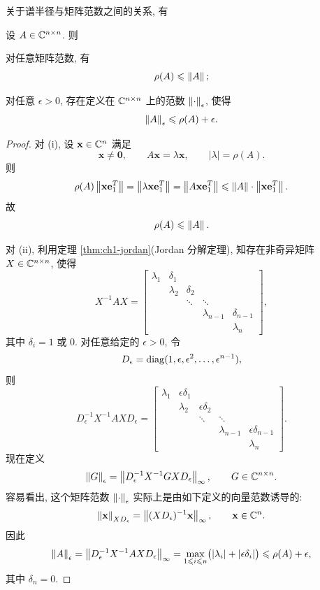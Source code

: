 关于谱半径与矩阵范数之间的关系, 有

\begin{theorem}
\label{thm:3-4}
设 $A\in\mathbb{C}^{n\times n}$. 则
\begin{romanlist}
  \item 对任意矩阵范数, 有
  \[
    \rho(A)\leqslant\left\|A\right\|;
  \]
  \item 对任意 $\epsilon>0$, 存在定义在 $\mathbb{C}^{n\times n}$ 上的范数 $\left\|\cdot\right\|_\epsilon$, 使得
  \[
    \left\|A\right\|_\epsilon\leqslant\rho(A)+\epsilon.
  \]
\end{romanlist}
\end{theorem}

\begin{proof}
对 (i), 设 $\mathbf{x}\in\mathbb{C}^n$ 满足
\[
  \mathbf{x}\neq\mathbf{0},\qquad A\mathbf{x}=\lambda\mathbf{x},\qquad|\lambda|=\rho(A).
\]
则
\[
  \rho(A)\left\|\mathbf{x}\mathbf{e}_1^T\right\|=\left\|\lambda\mathbf{x}\mathbf{e}_1^T\right\|
  =\left\|A\mathbf{x}\mathbf{e}_1^T\right\|\leqslant\left\|A\right\|\cdot\left\|\mathbf{x}\mathbf{e}_1^T\right\|.
\]
故
\[
  \rho(A)\leqslant\left\|A\right\|.
\]

对 (ii), 利用定理 \ref{thm:ch1-jordan}(Jordan 分解定理), 知存在非奇异矩阵 $X\in\mathbb{C}^{n\times n}$, 使得
\[
  X^{-1}AX=
  \begin{bmatrix}
    \lambda_1 & \delta_1 &           &        &                \\
              & \lambda_2 & \delta_2 &        &                \\
              &           & \ddots    & \ddots &                \\
              &           &           & \lambda_{n-1} & \delta_{n-1}\\
              &           &           &        & \lambda_n
  \end{bmatrix},
\]
其中 $\delta_i=1$ 或 $0$. 对任意给定的 $\epsilon>0$, 令
\[
  D_\epsilon=\operatorname{diag}(1,\epsilon,\epsilon^2,\ldots,\epsilon^{n-1}),
\]
则
\[
  D_\epsilon^{-1}X^{-1}AXD_\epsilon=
  \begin{bmatrix}
    \lambda_1 & \epsilon\delta_1 &           &        &                \\
              & \lambda_2 & \epsilon\delta_2 &        &                \\
              &           & \ddots    & \ddots &                \\
              &           &           & \lambda_{n-1} & \epsilon\delta_{n-1}\\
              &           &           &        & \lambda_n
  \end{bmatrix}.
\]
现在定义
\[
  \left\|G\right\|_\epsilon=\left\|D_\epsilon^{-1}X^{-1}GXD_\epsilon\right\|_\infty,
  \qquad G\in\mathbb{C}^{n\times n}.
\]
容易看出, 这个矩阵范数 $\left\|\cdot\right\|_\epsilon$ 实际上是由如下定义的向量范数诱导的:
\[
  \left\|\mathbf{x}\right\|_{XD_\epsilon}=\left\|(XD_\epsilon)^{-1}\mathbf{x}\right\|_\infty,
  \qquad\mathbf{x}\in\mathbb{C}^n.
\]
因此
\[
  \left\|A\right\|_\epsilon=\left\|D_\epsilon^{-1}X^{-1}AXD_\epsilon\right\|_\infty
  =\max_{1\leqslant i\leqslant n}\bigl(|\lambda_i|+|\epsilon\delta_i|\bigr)
  \leqslant\rho(A)+\epsilon,
\]
其中 $\delta_n=0$.
\end{proof}

